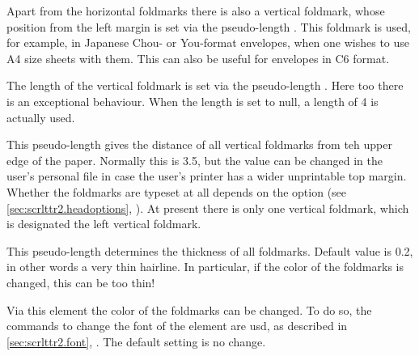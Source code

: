 \begin{Declaration}
\end{Declaration}
%
Apart from the horizontal
foldmarks there is also a vertical foldmark, whose position from the
left margin is set via the pseudo-length . This
foldmark is used, for example, in Japanese Chou- or You-format
envelopes, when one wishes to use A4 size sheets with them. This can
also be useful for envelopes in C6 format.
%


\begin{Declaration}
\end{Declaration}
%
The length of the vertical
foldmark is set via the pseudo-length .  Here
too there is an exceptional behaviour. When the length is set to null,
a length of 4 is actually used.
%


\begin{Declaration}
\end{Declaration}
%
This pseudo-length gives the
distance of all vertical foldmarks from teh upper edge of the
paper. Normally this is 3.5, but the value can be changed in the
user's personal  file in case the user's printer has a wider
unprintable top margin.  Whether the foldmarks are typeset at all
depends on the option  (see
\autoref{sec:scrlttr2.headoptions},
). At present there is
only one vertical foldmark, which is designated the left vertical
foldmark.
%
%
%


\begin{Declaration}
\end{Declaration}
%
This pseudo-length determines the
thickness of all foldmarks. Default value is 0.2, in other words a
very thin hairline. In particular, if the color of the foldmarks is
changed, this can be too thin!
%


\begin{Declaration}
\end{Declaration}
%
Via this element the color of the
foldmarks can be changed. To do so, the commands to change the font of
the element are usd, as described in \autoref{sec:scrlttr2.font},
. The default setting is no change.
%

